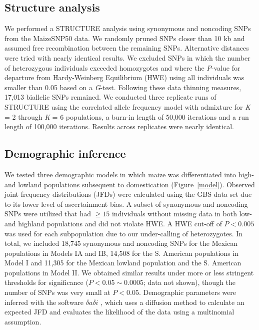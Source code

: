 \subsection*{Structure analysis}
We performed a {\sf STRUCTURE} analysis \cite[]{Pritchard_2000_10835412,Falush_2003_12930761} using synonymous and noncoding SNPs from the MaizeSNP50 data. 
We randomly pruned SNPs closer than 10 kb and assumed free recombination between the remaining SNPs.
Alternative distances were tried with nearly identical results. 
We excluded SNPs in which the number of heterozygous individuals exceeded homozygotes and where the \emph{P}-value for departure from Hardy-Weinberg Equilibrium (HWE) using all individuals was smaller than 0.05 based on a \emph{G}-test. 
Following these data thinning measures, 17,013 biallelic SNPs remained. 
We conducted three replicate runs of {\sf STRUCTURE} using the correlated allele frequency model with admixture for \emph{K} = 2 through \emph{K} = 6 populations, a burn-in length of 50,000 iterations and a run length of 100,000 iterations. 
Results across replicates were nearly identical.

\subsection*{Demographic inference}
We tested three demographic models in which maize was differentiated into high- and lowland populations subsequent to domestication (Figure~\ref{model}). 
Observed joint frequency distributions (JFDs) were calculated using the GBS data set due to its lower level of ascertainment bias. 
A subset of synonymous and noncoding SNPs were utilized that had $\geq15$ individuals without missing data in both low- and highland populations and did not violate HWE.  
A HWE cut-off of $P<0.005$ was used for each subpopulation due to our under-calling of heterozygotes. 
In total, we included 18,745 synonymous and noncoding SNPs for the Mexican populations in Models IA and IB, 14,508 for the S. American populations in Model I and 11,305 for the Mexican lowland population and the S. American populations in Model II.  
We obtained similar results under more or less stringent thresholds for significance ($P < 0.05 \sim 0.0005$; data not shown), though the number of SNPs was very small at $P<0.05$.  
Demographic parameters were inferred with the software $\delta a \delta i$ \cite[]{Gutenkunst_2009_19851460}, which uses a diffusion method to calculate an expected JFD and evaluates the likelihood of the data using a multinomial assumption. 

